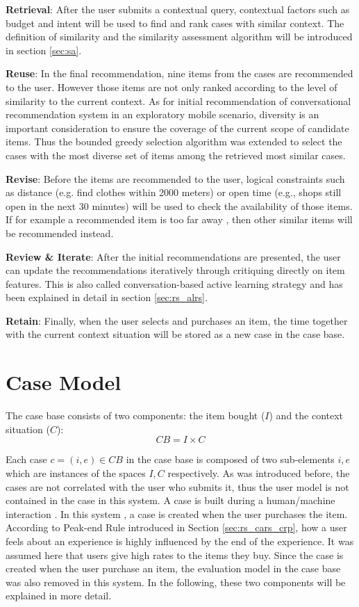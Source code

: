 \textbf{Retrieval}: After the user submits a contextual query, contextual factors such as budget and intent will be used to find and rank cases with similar context. The definition of similarity and the similarity assessment algorithm will be introduced in section \ref{sec:sa}. 

\textbf{Reuse}: In the final recommendation, nine items from the cases are recommended to the user. However those items are not only ranked according to the level of similarity to the current context. As for initial recommendation of conversational recommendation system in an exploratory mobile scenario, diversity is an important consideration to ensure the coverage of the current scope of candidate items. Thus the bounded greedy selection algorithm was extended to select the cases with the most diverse set of items among the retrieved most similar cases. 

\textbf{Revise}: Before the items are recommended to the user, logical constraints such as distance (e.g. find clothes within 2000 meters) or open time (e.g., shops still open in the next 30 minutes) will be used to check the availability of those items. If for example a recommended item is too far away , then other similar items will be recommended instead.

\textbf{Review \& Iterate}: After the initial recommendations are presented, the user can update the recommendations iteratively through critiquing directly on item features. This is also called conversation-based active learning strategy and has been explained in detail in section \ref{sec:rs_alrs}.

\textbf{Retain}: Finally, when the user selects and purchases an item, the time together with the current context situation will be stored as a new case in the case base.

\section{Case Model} \label{sec:cm}

The case base consists of two components: the item bought ($I$) and the context situation ($C$): 
\begin{equation} \label{eq:caseMode}
CB = I \times C
\end{equation}

Each case $c=(i,e) \in CB$ in the case base is composed of two sub-elements $i,e$ which are instances of the spaces $I,C$ respectively. As was introduced before, the cases are not correlated with the user who submits it, thus the user model is not contained in the case in this system. A case is built during a human/machine interaction \cite{ref:26}. In this system , a case is created when the user purchases the item. According to Peak-end Rule introduced in Section \ref{sec:rs_cars_crp}, how a user feels about an experience is highly influenced by the end of the experience. It was assumed here that users give high rates to the items they buy. Since the case is created when the user purchase an item, the evaluation model in the case base was also removed in this system. In the following, these two components will be explained in more detail. 

